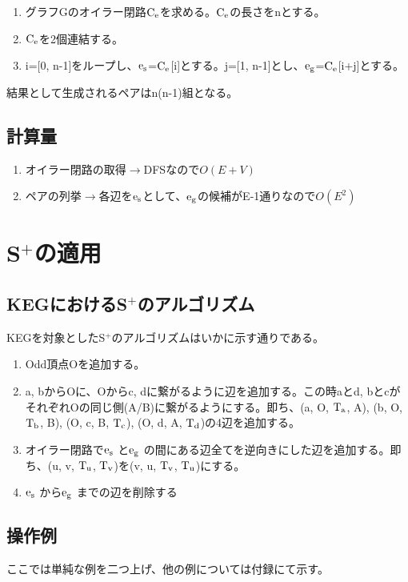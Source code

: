 \documentclass[11pt,a4j,draft]{jsreport}
\newcommand{\splus}{S${}^\text{+}$}
\newcommand{\fl}[1]{$\rm{#1}$}
\begin{document}
\begin{enumerate}
    \item グラフGのオイラー閉路\fl{C_e}を求める。\fl{C_e}の長さをnとする。
    \item \fl{C_e}を2個連結する。
    \item i=[0, n-1]をループし、\fl{e_s}=\fl{C_e}[i]とする。j=[1, n-1]とし、\fl{e_g}=\fl{C_e}[i+j]とする。
\end{enumerate}

結果として生成されるペアはn(n-1)組となる。

\subsection{計算量}
\begin{enumerate}
    \item オイラー閉路の取得$\rightarrow$DFSなので$O(E+V)$
    \item ペアの列挙$\rightarrow$各辺を\fl{e_s}として、\fl{e_g}の候補がE-1通りなので$O(E^2)$
\end{enumerate}


\section{\splus の適用}

\subsection{KEGにおける\splus のアルゴリズム}
KEGを対象とした\splus のアルゴリズムはいかに示す通りである。
\begin{enumerate}
    \item Odd頂点Oを追加する。
    \item a, bからOに、Oからc, dに繋がるように辺を追加する。この時aとd, bとcがそれぞれOの同じ側(A/B)に繋がるようにする。即ち、(a, O, \fl{T_a}, A), (b, O, \fl{T_b}, B), (O, c, B, \fl{T_c}), (O, d, A, \fl{T_d})の4辺を追加する。
    \item オイラー閉路で\fl{e_s} と\fl{e_g} の間にある辺全てを逆向きにした辺を追加する。即ち、(u, v, \fl{T_u}, \fl{T_v})を(v, u, \fl{T_v}, \fl{T_u})にする。
    \item \fl{e_s} から\fl{e_g} までの辺を削除する
\end{enumerate}

\subsection{操作例}
ここでは単純な例を二つ上げ、他の例については付録にて示す。
\end{document}
